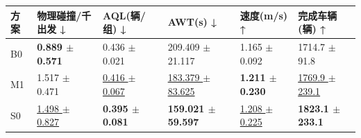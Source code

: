 \begin{tabular}{llllll}
\toprule
方案 & 物理碰撞/千出发 ↓ & AQL(辆/组) ↓ & AWT(s) ↓ & 速度(m/s) ↑ & 完成车辆(辆) ↑ \\
\midrule
B0 & \textbf{0.889 $\pm$ 0.571} & 0.436 $\pm$ 0.021 & 209.409 $\pm$ 21.117 & 1.165 $\pm$ 0.092 & 1714.7 $\pm$ 91.8 \\
M1 & 1.517 $\pm$ 0.471 & \underline{0.416 $\pm$ 0.067} & \underline{183.379 $\pm$ 83.625} & \textbf{1.211 $\pm$ 0.230} & \underline{1769.9 $\pm$ 239.1} \\
S0 & \underline{1.498 $\pm$ 0.827} & \textbf{0.395 $\pm$ 0.081} & \textbf{159.021 $\pm$ 59.597} & \underline{1.208 $\pm$ 0.225} & \textbf{1823.1 $\pm$ 233.1} \\
\bottomrule
\end{tabular}